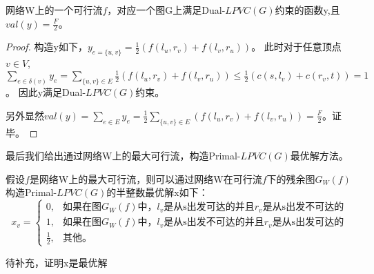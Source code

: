 \begin{property}
网络W上的一个可行流$f$，对应一个图G上满足Dual-$LPVC(G)$约束的函数y,且$val(y) = \frac{F}{2}$。
\end{property}
\begin{proof}
构造y如下，$y_{e = \{u, v\}} = \frac{1}{2}(f(l_u, r_v) + f(l_v, r_u))$。
此时对于任意顶点$v \in V$, $\sum\limits_{e \in \delta(v)}{y_e} = \sum\limits_{\{u, v\}\in E}{\frac{1}{2}(f(l_u, r_v) + f(l_v, r_u))} \le \frac{1}{2}(c(s, l_v) + c(r_v, t)) = 1$。
因此y满足Dual-$LPVC(G)$约束。

另外显然$val(y) = \sum_{e \in E}{y_e} = \frac{1}{2}\sum\limits_{\{u, v\}\in E}{(f(l_u, r_v) + f(l_v, r_u))} = \frac{F}{2}$。证毕。
\end{proof}

最后我们给出通过网络W上的最大可行流，构造Primal-$LPVC(G)$最优解方法。

假设$f$是网络W上的最大可行流，则可以通过网络W在可行流$f$下的残余图$G_W(f)$构造Primal-$LPVC(G)$的半整数最优解x如下：
\begin{equation*}
  x_v = \begin{cases}
            0, & \mbox{如果在图$G_W(f)$中，$l_v$是从s出发可达的并且$r_v$是从s出发不可达的}  \\
            1, & \mbox{如果在图$G_W(f)$中，$l_v$是从s出发不可达的并且$r_v$是从s出发可达的}  \\
            \frac{1}{2}, & \mbox{其他。}
          \end{cases}
\end{equation*}

\textcolor[rgb]{1.00,0.00,0.00}{待补充，证明x是最优解}